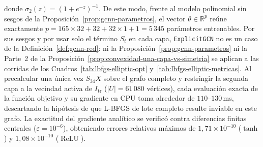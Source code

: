 \documentclass[a4paper,openany,oneside,10pt]{report}
\theoremstyle{pnlTeorema}
\theoremstyle{pnlDefinicion}
\theoremstyle{pnlObservacion}
\begin{document}
donde $\sigma_2(z)=(1+e^{-z})^{-1}$. De este modo, frente al modelo polinomial sin sesgos de la Proposición~\ref{prop:gcnn-parametros}, el vector $\theta\in\mathbb{R}^p$ reúne exactamente
$p=165\times 32+32+32\times 1+1=5\,345$ parámetros entrenables. Por sus sesgos y por usar solo el término $S_t$ en cada capa, \texttt{ExplicitGCN} no es un caso de la Definición~\ref{def:gcnn-red}: ni la Proposición~\ref{prop:gcnn-parametros} ni la Parte~2 de la Proposición~\ref{prop:convexidad-una-capa-vs-simetria} se aplican a las corridas de los Cuadros~\ref{tab:lbfgs-elliptic-opt} y~\ref{tab:lbfgs-elliptic-metricas}.
Al precalcular una única vez
$S_{34}X$ sobre el grafo completo y restringir la segunda capa a la vecindad
activa de $I_{\mathrm{tr}}$ ($|U|=61\,080$ vértices), cada evaluación exacta de
la función objetivo y su gradiente en CPU toma alrededor de $110$--$130\,$ms,
descartando la hipótesis de que L-BFGS de lote completo resulte inviable en este
grafo. La exactitud del gradiente analítico se verificó contra diferencias
finitas centrales ($\varepsilon=10^{-6}$), obteniendo errores relativos máximos
de $1{,}71\times 10^{-10}$ ($\tanh$) y $1{,}08\times 10^{-10}$ ($\operatorname{ReLU}$).
\end{document}
